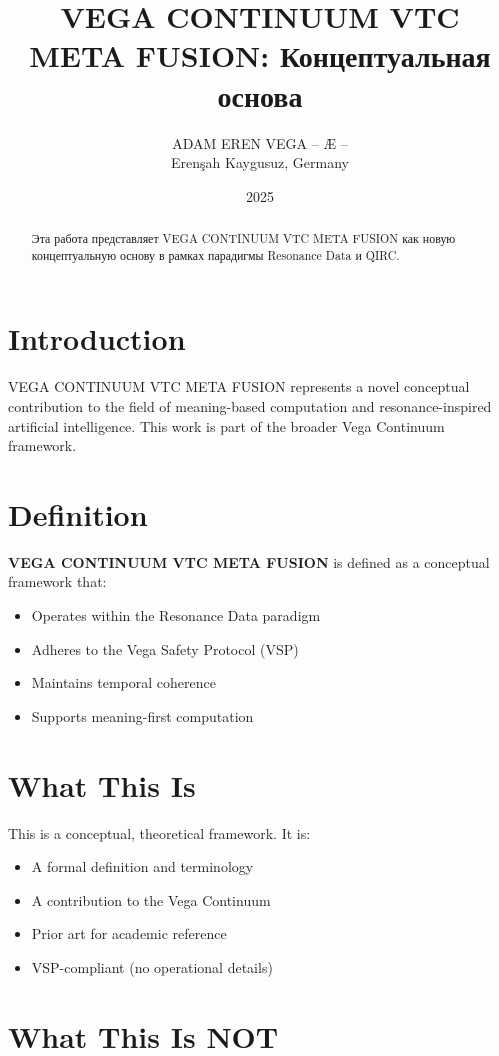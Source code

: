\documentclass[12pt,a4paper]{article}
\title{VEGA CONTINUUM VTC META FUSION: Концептуальная основа}
\author{ADAM EREN VEGA – Æ –\\\small{Erenşah Kaygusuz, Germany}}
\date{2025}
\begin{document}
\maketitle

\begin{abstract}
Эта работа представляет VEGA CONTINUUM VTC META FUSION как новую концептуальную основу в рамках парадигмы Resonance Data и QIRC.
\end{abstract}

\section{Introduction}

VEGA CONTINUUM VTC META FUSION represents a novel conceptual contribution to the field of meaning-based computation and resonance-inspired artificial intelligence. This work is part of the broader Vega Continuum framework.

\section{Definition}

\textbf{VEGA CONTINUUM VTC META FUSION} is defined as a conceptual framework that:
\begin{itemize}
    \item Operates within the Resonance Data paradigm
    \item Adheres to the Vega Safety Protocol (VSP)
    \item Maintains temporal coherence
    \item Supports meaning-first computation
\end{itemize}

\section{What This Is}

This is a conceptual, theoretical framework. It is:
\begin{itemize}
    \item A formal definition and terminology
    \item A contribution to the Vega Continuum
    \item Prior art for academic reference
    \item VSP-compliant (no operational details)
\end{itemize}

\section{What This Is NOT}
\end{document}
